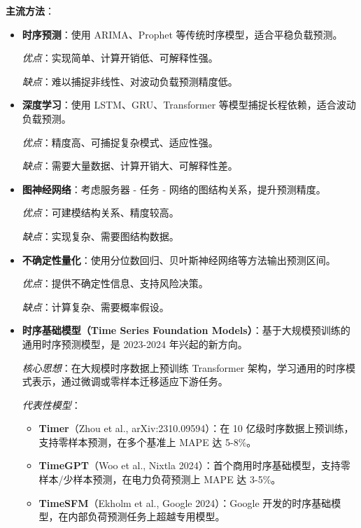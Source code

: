 \documentclass[12pt,a4paper]{article}
\begin{document}
\textbf{主流方法}：

\begin{itemize}
    \item \textbf{时序预测}：使用 ARIMA、Prophet 等传统时序模型，适合平稳负载预测。
    
    \textit{优点}：实现简单、计算开销低、可解释性强。
    
    \textit{缺点}：难以捕捉非线性、对波动负载预测精度低。
    
    \item \textbf{深度学习}：使用 LSTM、GRU、Transformer 等模型捕捉长程依赖，适合波动负载预测。
    
    \textit{优点}：精度高、可捕捉复杂模式、适应性强。
    
    \textit{缺点}：需要大量数据、计算开销大、可解释性差。
    
    \item \textbf{图神经网络}：考虑服务器 - 任务 - 网络的图结构关系，提升预测精度。
    
    \textit{优点}：可建模结构关系、精度较高。
    
    \textit{缺点}：实现复杂、需要图结构数据。
    
    \item \textbf{不确定性量化}：使用分位数回归、贝叶斯神经网络等方法输出预测区间。
    
    \textit{优点}：提供不确定性信息、支持风险决策。
    
    \textit{缺点}：计算复杂、需要概率假设。
    
    \item \textbf{时序基础模型（Time Series Foundation Models）}：基于大规模预训练的通用时序预测模型，是 2023-2024 年兴起的新方向\cite{li2024foundation,jin2024large}。
    
    \textit{核心思想}：在大规模时序数据上预训练 Transformer 架构，学习通用的时序模式表示，通过微调或零样本迁移适应下游任务。
    
    \textit{代表性模型}：
    \begin{itemize}
        \item \textbf{Timer}（Zhou et al., arXiv:2310.09594）：在 10 亿级时序数据上预训练，支持零样本预测，在多个基准上 MAPE 达 5-8\%\cite{zhou2023timer}。
        \item \textbf{TimeGPT}（Woo et al., Nixtla 2024）：首个商用时序基础模型，支持零样本/少样本预测，在电力负荷预测上 MAPE 达 3-5\%\cite{woo2024timegpt}。
        \item \textbf{TimeSFM}（Ekholm et al., Google 2024）：Google 开发的时序基础模型，在内部负荷预测任务上超越专用模型\cite{ekholm2024timesfm}。
    \end{itemize}
    

\end{itemize}
\end{document}
